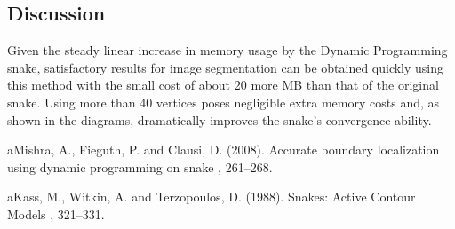 \documentclass[twoside]{article}
\begin{document}
\begin{multicols}{2}

\section{Discussion}

Given the steady linear increase in memory usage by the Dynamic Programming snake, satisfactory results for image segmentation can be obtained quickly using this method with the small cost of about 20 more MB than that of the original snake. Using more than 40 vertices poses negligible extra memory costs and, as shown in the diagrams, dramatically improves the snake's convergence ability.


\begin{thebibliography}{99} %

aMishra, A., Fieguth, P. and Clausi, D. (2008).
\newblock Accurate boundary localization using dynamic programming on snake
, 261--268.

aKass, M., Witkin, A. and Terzopoulos, D. (1988).
\newblock Snakes: Active Contour Models 
, 321--331.
 
\end{thebibliography}


\end{multicols}
\end{document}
